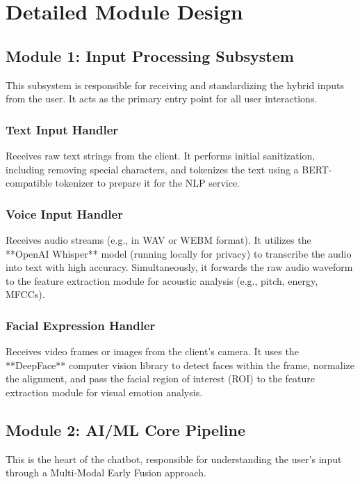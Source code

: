 \section{Detailed Module Design}

\subsection{Module 1: Input Processing Subsystem}
This subsystem is responsible for receiving and standardizing the hybrid inputs from the user. It acts as the primary entry point for all user interactions.

\subsubsection{Text Input Handler}
Receives raw text strings from the client. It performs initial sanitization, including removing special characters, and tokenizes the text using a BERT-compatible tokenizer to prepare it for the NLP service.

\subsubsection{Voice Input Handler}
Receives audio streams (e.g., in WAV or WEBM format). It utilizes the **OpenAI Whisper** model (running locally for privacy) to transcribe the audio into text with high accuracy. Simultaneously, it forwards the raw audio waveform to the feature extraction module for acoustic analysis (e.g., pitch, energy, MFCCs).

\subsubsection{Facial Expression Handler}
Receives video frames or images from the client's camera. It uses the **DeepFace** computer vision library to detect faces within the frame, normalize the alignment, and pass the facial region of interest (ROI) to the feature extraction module for visual emotion analysis.

\subsection{Module 2: AI/ML Core Pipeline}
This is the heart of the chatbot, responsible for understanding the user's input through a Multi-Modal Early Fusion approach.

